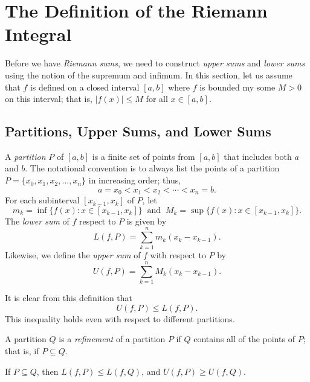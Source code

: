 \section{The Definition of the Riemann Integral}

Before we have \textit{Riemann sums}, we need to construct \textit{upper sums}  and \textit{lower sums} using the notion of the supremum and infimum. In this section, let us assume that \( f  \) is defined on a closed interval \( [a,b]  \) where \( f  \) is bounded my some \( M > 0  \) on this interval; that is, \( | f(x)  | \leq M  \) for all \( x \in [a,b] \). 

\subsection{Partitions, Upper Sums, and Lower Sums}

\begin{definition}
	A \textit{partition} \( P  \) of \( [a,b]  \) is a finite set of points from \( [a,b]  \) that includes both \( a  \) and \( b  \). The notational convention is to always list the points of a partition \( P = \{ x_{0}, x_{1}, x_{2}, \dots, x_{n} \}  \) in increasing order; thus, \[  a = x_{0} < x_{1} < x_{2} < \dotsb < x_{n} = b. \]
	For each subinterval \( [x_{k-1}, x_{k} ] \) of \( P  \), let 
	\[  m_{k } = \inf \{ f(x) : x \in [x_{k-1} , x_{k } ] \} \ \text{ and } \  M_{k } = \sup \{ f(x) : x \in [x_{k-1}, x_{k }] \}. \]
	The \textit{lower sum} of \( f  \) respect to \( P  \) is given by 
	\[  L(f, P ) = \sum_{ k=1 }^{ n } m_{ k } ( x_{k } -  x_{ k -1 }). \]
	Likewise, we define the \textit{upper sum} of \( f  \) with respect to \( P  \) by 
	\[  U(f, P ) = \sum_{ k=1 }^{ n } M_k ( x_{k } - x_{ k -1 }). \]
\end{definition}

It is clear from this definition that 
\[  U(f, P ) \leq L(f, P ).\]  This inequality holds even with respect to different partitions.

\begin{definition}
A partition \( Q  \) is a \textit{refinement} of a partition \( P  \) if \( Q  \) contains all of the points of \( P  \); that is, if \( P \subseteq Q  \).



\end{definition}

\begin{lemma}
If \( P \subseteq Q  \), then \( L(f,P) \leq L(f,Q)  \), and \( U(f,P ) \geq U(f,Q) \).
\end{lemma}

